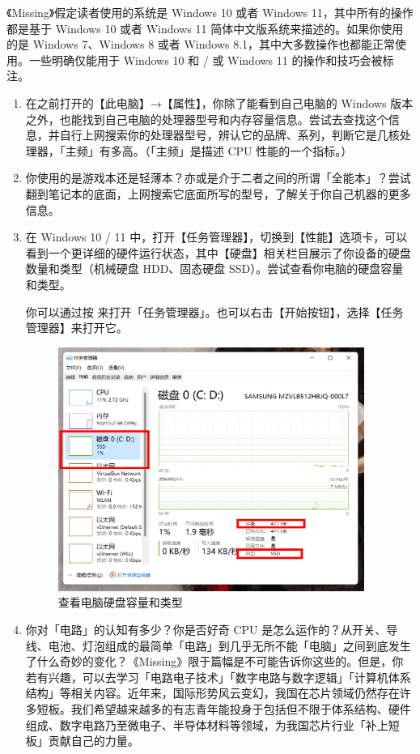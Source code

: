 《Missing》假定读者使用的系统是 Windows 10 或者 Windows 11，其中所有的操作都是基于 Windows 10 或者 Windows 11 简体中文版系统来描述的。如果你使用的是 Windows 7、Windows 8 或者 Windows 8.1，其中大多数操作也都能正常使用。一些明确仅能用于 Windows 10 和 / 或 Windows 11 的操作和技巧会被标注。

\practice

\begin{enumerate}
  \item 在之前打开的【此电脑】→【属性】，你除了能看到自己电脑的 Windows 版本之外，也能找到自己电脑的处理器型号和内存容量信息。尝试去查找这个信息，并自行上网搜索你的处理器型号，辨认它的品牌、系列，判断它是几核处理器，「主频」有多高。（「主频」是描述 CPU 性能的一个指标。）
  \item 你使用的是游戏本还是轻薄本？亦或是介于二者之间的所谓「全能本」？尝试翻到笔记本的底面，上网搜索它底面所写的型号，了解关于你自己机器的更多信息。
  \item 在 Windows 10 / 11 中，打开【任务管理器】，切换到【性能】选项卡，可以看到一个更详细的硬件运行状态，其中【硬盘】相关栏目展示了你设备的硬盘数量和类型（机械硬盘 HDD、固态硬盘 SSD）。尝试查看你电脑的硬盘容量和类型。
  
  你可以通过按  来打开「任务管理器」。也可以右击【开始按钮】，选择【任务管理器】来打开它。
  \begin{figure}[H]
    \centering
    \includegraphics[width=10cm]{assets/Check_disk_status.png}
    \caption{查看电脑硬盘容量和类型}
    \label{check-disk}
  \end{figure}
  \item 你对「电路」的认知有多少？你是否好奇 CPU 是怎么运作的？从开关、导线、电池、灯泡组成的最简单「电路」到几乎无所不能「电脑」之间到底发生了什么奇妙的变化？《Missing》限于篇幅是不可能告诉你这些的。但是，你若有兴趣，可以去学习「电路电子技术」「数字电路与数字逻辑」「计算机体系结构」等相关内容。近年来，国际形势风云变幻，我国在芯片领域仍然存在许多短板。我们希望越来越多的有志青年能投身于包括但不限于体系结构、硬件组成、数字电路乃至微电子、半导体材料等领域，为我国芯片行业「补上短板」贡献自己的力量。
\end{enumerate}

